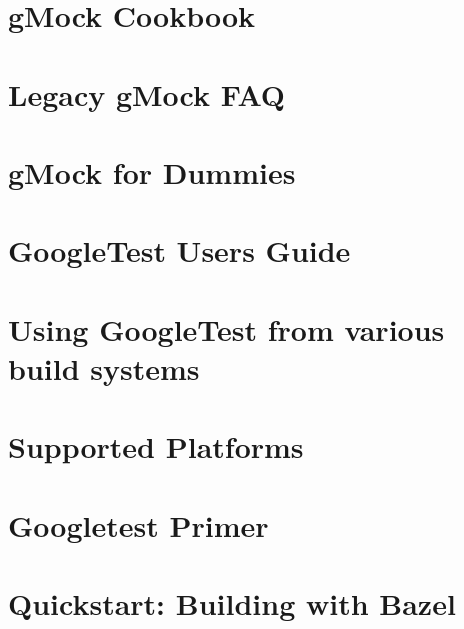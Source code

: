 \let\mypdfximage\pdfximage\def\pdfximage{\immediate\mypdfximage}\documentclass[twoside]{book}
\newcommand{\+}{\discretionary{\mbox{\scriptsize$\hookleftarrow$}}{}{}}
\begin{document}
\chapter{g\+Mock Cookbook}
\label{md_build_googletest-src_docs_gmock_cook_book}

\chapter{Legacy g\+Mock F\+AQ}
\label{md_build_googletest-src_docs_gmock_faq}

\chapter{g\+Mock for Dummies}
\label{md_build_googletest-src_docs_gmock_for_dummies}

\chapter{Google\+Test User\textquotesingle{}s Guide}
\label{md_build_googletest-src_docs_index}

\chapter{Using Google\+Test from various build systems}
\label{md_build_googletest-src_docs_pkgconfig}

\chapter{Supported Platforms}
\label{md_build_googletest-src_docs_platforms}

\chapter{Googletest Primer}
\label{md_build_googletest-src_docs_primer}

\chapter{Quickstart\+: Building with Bazel}
\label{md_build_googletest-src_docs_quickstart-bazel}

\end{document}
